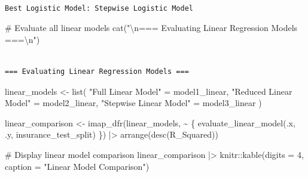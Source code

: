 \documentclass[
  11pt]{article}
\newenvironment{Shaded}{\begin{snugshade}}{\end{snugshade}}
\newcommand{\AttributeTok}[1]{\textcolor[rgb]{0.40,0.45,0.13}{#1}}
\newcommand{\CommentTok}[1]{\textcolor[rgb]{0.37,0.37,0.37}{#1}}
\newcommand{\DecValTok}[1]{\textcolor[rgb]{0.68,0.00,0.00}{#1}}
\newcommand{\FunctionTok}[1]{\textcolor[rgb]{0.28,0.35,0.67}{#1}}
\newcommand{\NormalTok}[1]{\textcolor[rgb]{0.00,0.23,0.31}{#1}}
\newcommand{\OtherTok}[1]{\textcolor[rgb]{0.00,0.23,0.31}{#1}}
\newcommand{\SpecialCharTok}[1]{\textcolor[rgb]{0.37,0.37,0.37}{#1}}
\newcommand{\StringTok}[1]{\textcolor[rgb]{0.13,0.47,0.30}{#1}}
\begin{document}
\begin{verbatim}

Best Logistic Model: Stepwise Logistic Model 
\end{verbatim}

\begin{Shaded}
\begin{Highlighting}[]
\CommentTok{\# Evaluate all linear models}
\FunctionTok{cat}\NormalTok{(}\StringTok{"}\SpecialCharTok{\textbackslash{}n}\StringTok{=== Evaluating Linear Regression Models ===}\SpecialCharTok{\textbackslash{}n}\StringTok{"}\NormalTok{)}
\end{Highlighting}
\end{Shaded}

\begin{verbatim}

=== Evaluating Linear Regression Models ===
\end{verbatim}

\begin{Shaded}
\begin{Highlighting}[]
\NormalTok{linear\_models }\OtherTok{\textless{}{-}} \FunctionTok{list}\NormalTok{(}
    \StringTok{"Full Linear Model"} \OtherTok{=}\NormalTok{ model1\_linear,}
    \StringTok{"Reduced Linear Model"} \OtherTok{=}\NormalTok{ model2\_linear,}
    \StringTok{"Stepwise Linear Model"} \OtherTok{=}\NormalTok{ model3\_linear}
\NormalTok{)}

\NormalTok{linear\_comparison }\OtherTok{\textless{}{-}} \FunctionTok{imap\_dfr}\NormalTok{(linear\_models, }\SpecialCharTok{\textasciitilde{}}\NormalTok{ \{}
    \FunctionTok{evaluate\_linear\_model}\NormalTok{(.x, .y, insurance\_test\_split)}
\NormalTok{\}) }\SpecialCharTok{|\textgreater{}} \FunctionTok{arrange}\NormalTok{(}\FunctionTok{desc}\NormalTok{(R\_Squared))}

\CommentTok{\# Display linear model comparison}
\NormalTok{linear\_comparison }\SpecialCharTok{|\textgreater{}} 
\NormalTok{    knitr}\SpecialCharTok{::}\FunctionTok{kable}\NormalTok{(}\AttributeTok{digits =} \DecValTok{4}\NormalTok{, }\AttributeTok{caption =} \StringTok{"Linear Model Comparison"}\NormalTok{)}
\end{Highlighting}
\end{Shaded}
\end{document}
